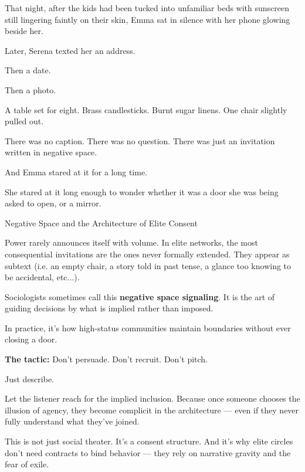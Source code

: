 That night, after the kids had been tucked into unfamiliar beds with sunscreen still lingering faintly 
on their skin, Emma sat in silence with her phone glowing beside her.

Later, Serena texted her an address.

Then a date.

Then a photo.

A table set for eight. Brass candlesticks. Burnt sugar linens.
One chair slightly pulled out.

There was no caption.
There was no question.
There was just an invitation written in negative space.

And Emma stared at it for a long time.

She stared at it long enough to wonder whether it was a door she was being asked to open,
or a mirror.

\medskip

\begin{PsychologicalSidebar}{Negative Space and the Architecture of Elite Consent}

Power rarely announces itself with volume.  
In elite networks, the most consequential invitations are the ones never formally extended.  
They appear as subtext (i.e. an empty chair, a story told in past tense, a glance too knowing 
to be accidental, etc...).

\medskip

Sociologists sometimes call this \textbf{negative space signaling}. It is the art of guiding 
decisions by what is implied rather than imposed.  

\medskip

In practice, it's how high-status communities maintain boundaries without ever closing a door.  

\medskip

\textbf{The tactic:}  Don’t persuade. Don’t recruit. Don’t pitch.

\medskip

Just describe.

\medskip

Let the listener reach for the implied inclusion.  
Because once someone chooses the illusion of agency, they become complicit in the architecture — even if 
they never fully understand what they’ve joined.

\medskip

This is not just social theater.  
It’s a consent structure.  
And it’s why elite circles don’t need contracts to bind behavior — they rely on narrative gravity and the fear of exile.

\end{PsychologicalSidebar}

